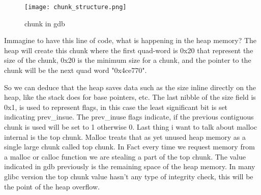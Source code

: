\documentclass{report}
\begin{document}
    \begin{figure}[htbp]
        \centering
        \texttt{[image: chunk\_structure.png]}
        \caption{chunk in gdb}
        \label{fig:enter-label}
    \end{figure}
    
    Immagine to have this line of code, what is happening in the heap memory?\newline
    The heap will create this chunk where the first quad-word is 0x20 that represent the size of the chunk, 0x20 is the minimum size for a chunk, and the pointer to the chunk will be the next quad word "0x4ce770".\newline

    So we can deduce that the heap saves data such as the size inline directly on the heap, like the stack does for base pointers, etc.\newline
    The last nibble of the size field is 0x1, is used to represent flags, in this case the least significant bit is set indicating prev\_insue.\newline
    The prev\_inuse flags indicate, if the previous contiguous chunk is used will be set to 1 otherwise 0. \newline
    Last thing i want to talk about malloc internal is the top chunk.\newline
    Malloc treats that as yet unused heap memory as a single large chunk called top chunk.\newline
    In Fact every time we request memory from a malloc or calloc function we are stealing a part of the top chunk.\newline
    The value indicated in gdb previously is the remaining space of the heap memory.\newline
    In many glibc version the top chunk value hasn't any type of integrity check, this will be the point of the heap overflow.\newline
    \clearpage
    
\end{document}
